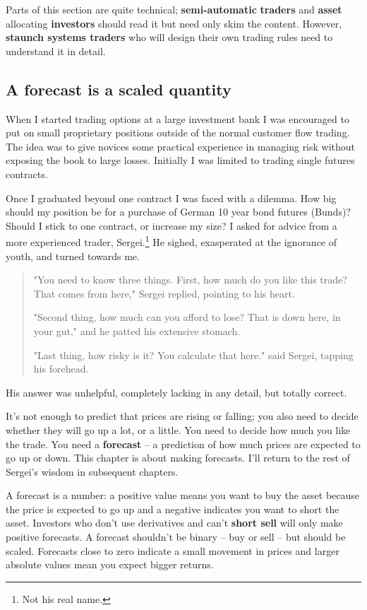 Parts of this section are quite technical; \textbf{semi-automatic} \textbf{traders} and \textbf{asset} allocating \textbf{investors} should read it but need only skim the content. However, \textbf{staunch systems traders} who will design their own trading rules need to understand it in detail.

\subsection*{A forecast is a scaled quantity}

When I started trading options at a large investment bank I was encouraged to put on small proprietary positions outside of the normal customer flow trading. The idea was to give novices some practical experience in managing risk without exposing the book to large losses. Initially I was limited to trading single futures contracts.

Once I graduated beyond one contract I was faced with a dilemma. How big should my position be for a purchase of German 10 year bond futures (Bunds)? Should I stick to one contract, or increase my size? I asked for advice from a more experienced trader, Sergei.\footnote{Not his real name.} He sighed, exasperated at the ignorance of youth, and turned towards me.

\begin{quote}
"You need to know three things. First, how much do you like this trade? That comes from here," Sergei replied, pointing to his heart. 

"Second thing, how much can you afford to lose? That is down here, in your gut," and he patted his extensive stomach. 

"Last thing, how risky is it? You calculate that here." said Sergei, tapping his forehead.
\end{quote}

His answer was unhelpful, completely lacking in any detail, but totally correct.

It's not enough to predict that prices are rising or falling; you also need to decide whether they will go up a lot, or a little. You need to decide how much you like the trade. You need a \textbf{forecast} -- a prediction of how much prices are expected to go up or down. This chapter is about making forecasts. I'll return to the rest of Sergei's wisdom in subsequent chapters.

A forecast is a number: a positive value means you want to buy the asset because the price is expected to go up and a negative indicates you want to short the asset. Investors who don't use derivatives and can't \textbf{short sell} will only make positive forecasts. A forecast shouldn't be binary -- buy or sell -- but should be scaled. Forecasts close to zero indicate a small movement in prices and larger absolute values mean you expect bigger returns.

